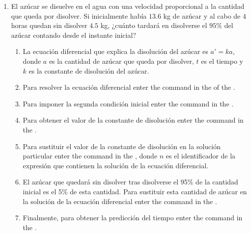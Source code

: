 \begin{enumerate}[leftmargin=*]
\item El azúcar se disuelve en el agua con una velocidad proporcional a la cantidad que queda por disolver.
      Si inicialmente había $13.6$ kg de azúcar y al cabo de $4$ horas quedan sin disolver $4.5$ kg, ¿cuánto tardará en disolverse el $95\%$ del
      azúcar contando desde el instante inicial?
      \begin{indication}
      \begin{enumerate}
      \item La ecuación diferencial que explica la disolución del azúcar es $a'=ka$, donde $a$ es la cantidad de azúcar que queda por disolver, $t$ es el tiempo y $k$ es la constante de disolución del azúcar.
      \item Para resolver la ecuación diferencial enter the command  in the  of the .
      \item Para imponer la segunda condición inicial enter the command  in the .
      \item Para obtener el valor de la constante de disolución enter the command  in the .
      \item Para sustituir el valor de la constante de disolución en la solución particular enter the command   in the , donde $n$ es el identificador de la expresión que contienen la solución de la ecuación diferencial.
      \item El azúcar que quedará sin disolver tras disolverse el 95\% de la cantidad inicial es el 5\% de esta cantidad.
            Para sustituir esta cantidad de azúcar en la solución de la ecuación diferencial enter the command  in the .
      \item Finalmente, para obtener la predicción del tiempo enter the command   in the .
      \end{enumerate}
      \end{indication}

\end{enumerate}



